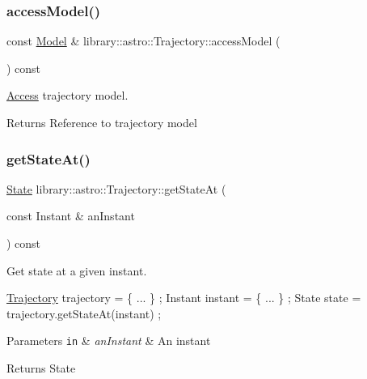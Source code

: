 \subsubsection{\texorpdfstring{access\+Model()}{accessModel()}}
{\footnotesize\ttfamily const \hyperlink{classlibrary_1_1astro_1_1trajectory_1_1_model}{Model} \& library\+::astro\+::\+Trajectory\+::access\+Model (\begin{DoxyParamCaption}{ }\end{DoxyParamCaption}) const}



\hyperlink{classlibrary_1_1astro_1_1_access}{Access} trajectory model. 

\begin{DoxyReturn}{Returns}
Reference to trajectory model 
\end{DoxyReturn}
\mbox{\label{classlibrary_1_1astro_1_1_trajectory_a5b27c8ad8d547a00ad32c4ab1d63984f}} 
\subsubsection{\texorpdfstring{get\+State\+At()}{getStateAt()}}
{\footnotesize\ttfamily \hyperlink{classlibrary_1_1astro_1_1trajectory_1_1_state}{State} library\+::astro\+::\+Trajectory\+::get\+State\+At (\begin{DoxyParamCaption}\item[{const Instant \&}]{an\+Instant }\end{DoxyParamCaption}) const}



Get state at a given instant. 


\begin{DoxyCode}
\hyperlink{classlibrary_1_1astro_1_1_trajectory_a8e5c7740915ca947e067c0f419ac1c65}{Trajectory} trajectory = \{ ... \} ;
Instant instant = \{ ... \} ;
State state = trajectory.getStateAt(instant) ;
\end{DoxyCode}



\begin{DoxyParams}[1]{Parameters}
\mbox{\tt in}  & {\em an\+Instant} & An instant \\
\hline
\end{DoxyParams}
\begin{DoxyReturn}{Returns}
State 
\end{DoxyReturn}
\mbox{\label{classlibrary_1_1astro_1_1_trajectory_a0b7d9ed6012f968b1bfde1f2cc4e34f5}} 
